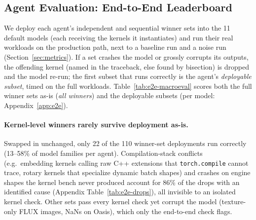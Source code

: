 \begin{table}[t]
  \centering
  \caption{\textbf{Kernel agents on \fastkernels{} (B200, default set).}
  \emph{Corr.}: operators correct on every benchmarked case; \emph{Geo.}: geomean speedup over correct operators; fast$_p$: correct and more than $p\times$ faster than production (Appendix~\ref{app:fastp}).
  Composed and sequential rows contain winners only.}
  \label{tab:kernel-levels}
  \small
  \setlength{\tabcolsep}{3pt}
  \resizebox{\linewidth}{!}{}
\end{table}

\subsection{Agent Evaluation: End-to-End Leaderboard}
\label{sec:eval-e2e}

We deploy each agent's independent and sequential winner sets into the 11 default models (each receiving the kernels it instantiates) and run their real workloads on the production path, next to a baseline run and a noise run (Section~\ref{sec:metrics}).
If a set crashes the model or grossly corrupts its outputs, the offending kernel (named in the traceback, else found by bisection) is dropped and the model re-run; the first subset that runs correctly is the agent's \emph{deployable subset}, timed on the full workloads.
Table~\ref{tab:e2e-macroeval} scores both the full winner sets as-is (\emph{all winners}) and the deployable subsets (per model: Appendix~\ref{app:e2e}).

\begin{table}[t]
  \centering
  \caption{\textbf{End-to-end \textsc{MacroEval} leaderboard on the default set (B200).} \emph{Rank}: position of each agent--mode entry by Score (10 entries).
  \emph{Valid}: models with $C_i \geq \tau$; macro metrics as in Section~\ref{sec:metrics}; \emph{Thr.}/\emph{Lat.}: $\lambda{=}1$/$\lambda{=}0$.
  \emph{Deployable subset}: after dropping the kernels that crash or break the model; \emph{All winners}: every kernel-level winner as-is.}
  \label{tab:e2e-macroeval}
  \small
  \setlength{\tabcolsep}{3pt}
  \resizebox{\linewidth}{!}{}
\end{table}


\paragraph{Kernel-level winners rarely survive deployment as-is.}
Swapped in unchanged, only 22 of the 110 winner-set deployments run correctly (13--58\% of model families per agent).
Compilation-stack conflicts (e.g.\ embedding kernels calling raw C++ extensions that \texttt{torch.compile} cannot trace, rotary kernels that specialize dynamic batch shapes) and crashes on engine shapes the kernel bench never produced account for 86\% of the drops with an identified cause (Appendix Table~\ref{tab:e2e-drops}), all invisible to an isolated kernel check.
Other sets pass every kernel check yet corrupt the model (texture-only FLUX images, NaNs on Oasis), which only the end-to-end check flags.

